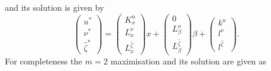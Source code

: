 \documentclass[journal]{IEEEtran}
\theoremstyle{remark}
\theoremstyle{definition}
\begin{document}
%
and its solution is given by
%
\[
  \left(\begin{array}{c}
  u^\ast \\
  \nu^\ast \\
  \hat\zeta^\ast
  \end{array}\right) = \left(\begin{array}{c}K^u_x\\ L^{\nu}_x \\ L^{\hat\zeta}_x
  \end{array}\right)x + 
  \left(\begin{array}{c}0\\ L^{\nu}_\beta \\ L^{\hat\zeta}_{\beta}
  \end{array}\right)\beta + \left(\begin{array}{c}k^u\\ l^{\nu} \\ l^{\hat\zeta}
  \end{array}\right).
\]
%
For completeness the $m=2$ maximisation and its solution are given as
%
\end{document}
